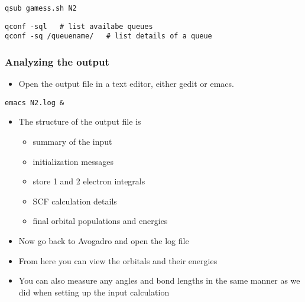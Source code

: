 \documentclass[11pt]{article}
\begin{document}
\begin{verbatim}
qsub gamess.sh N2
\end{verbatim}

\begin{verbatim}
qconf -sql   # list availabe queues
qconf -sq /queuename/   # list details of a queue
\end{verbatim}



\subsubsection{Analyzing the output}
\label{sec:org12f48cb}

\begin{itemize}
\item Open the output file in a text editor, either gedit or emacs.
\end{itemize}

\begin{verbatim}
emacs N2.log &
\end{verbatim}

\begin{itemize}
\item The structure of the output file is
\begin{itemize}
\item summary of the input
\item initialization messages
\item store 1 and 2 electron integrals
\item SCF calculation details
\item final orbital populations and energies
\end{itemize}

\item Now go back to Avogadro and open the log file

\item From here you can view the orbitals and their energies

\item You can also measure any angles and bond lengths in the same manner as we did when setting up the input calculation
\end{itemize}
\end{document}
